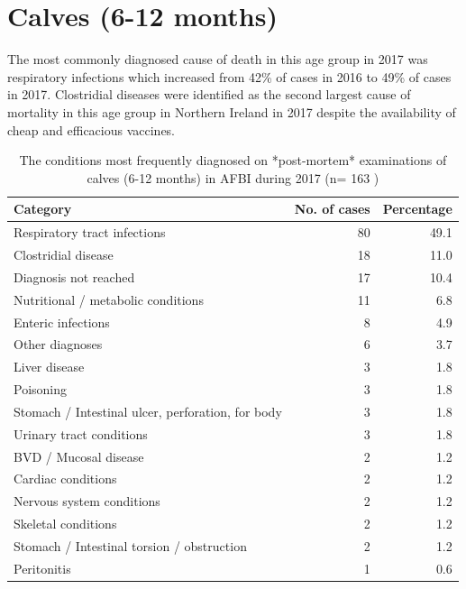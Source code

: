\documentclass[]{book}
\begin{document}
\section{Calves (6-12 months)}\label{calves-6-12-months}

The most commonly diagnosed cause of death in this age group in 2017 was
respiratory infections which increased from 42\% of cases in 2016 to
49\% of cases in 2017. Clostridial diseases were identified as the
second largest cause of mortality in this age group in Northern Ireland
in 2017 despite the availability of cheap and efficacious vaccines.

\begin{table}

\caption{\label{tab:unnamed-chunk-13}The conditions most frequently diagnosed on *post-mortem* examinations of calves (6-12 months) in  AFBI during 2017 (n= 163 )}
\centering
\begin{tabular}[t]{l|r|r}
\hline
Category & No. of cases & Percentage\\
\hline
Respiratory tract infections & 80 & 49.1\\
\hline
Clostridial disease & 18 & 11.0\\
\hline
Diagnosis not reached & 17 & 10.4\\
\hline
Nutritional / metabolic conditions & 11 & 6.8\\
\hline
Enteric infections & 8 & 4.9\\
\hline
Other diagnoses & 6 & 3.7\\
\hline
Liver disease & 3 & 1.8\\
\hline
Poisoning & 3 & 1.8\\
\hline
Stomach / Intestinal ulcer, perforation, for body & 3 & 1.8\\
\hline
Urinary tract conditions & 3 & 1.8\\
\hline
BVD / Mucosal disease & 2 & 1.2\\
\hline
Cardiac conditions & 2 & 1.2\\
\hline
Nervous system conditions & 2 & 1.2\\
\hline
Skeletal conditions & 2 & 1.2\\
\hline
Stomach / Intestinal torsion / obstruction & 2 & 1.2\\
\hline
Peritonitis & 1 & 0.6\\
\hline
\end{tabular}
\end{table}
\end{document}
